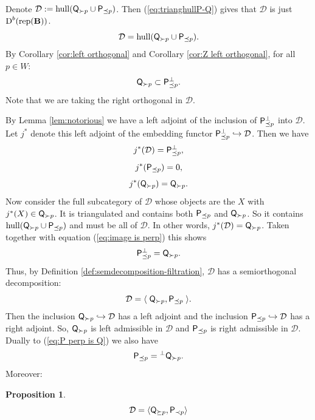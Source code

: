 \documentclass[sn-mathphys-num]{sn-jnl}%
\newcommand{\D}{\mathcal D}
\newcommand{\subsetq}{\subset}
\newcommand{\rep}{{\mathrm{rep}}}
\newcommand{\hull}{{\mathrm{hull}}}
\newcommand*{\Dd}{\mathop{\mathrm D\kern0pt}\nolimits}
\newcommand{\fb}{\mathbf B}
\newtheorem{proposition}[theorem]{Proposition}
\theoremstyle{definition}
\begin{document}
\ 

Denote $\D:=\hull({\sf Q}_{\succ p} \cup {\sf P}_{\preceq p})$. Then (\ref{eq:trianghullP-Q}) gives that $\D$ is just $\Dd ^b(\rep( \fb))$.
\begin{equation}\label{eq:Q>pPleqp-generation}
\D=\hull({\sf Q}_{\succ p} \cup {\sf P}_{\preceq p}).
\end{equation}
By Corollary \ref{cor:left orthogonal} and Corollary \ref{cor:Z left orthogonal}, for all $p\in W$:
\begin{equation}
{\sf Q}_{\succ p}\subsetq{\sf P}_{\preceq p}^{\perp}.
\end{equation}
Note that we are taking the right orthogonal in $\D$.

By Lemma \ref{lem:notorious}  we have a left adjoint of the inclusion of ${\sf P}_{\preceq p}^\perp$ into $\D$.
Let $j^*$ denote this left adjoint of the embedding functor ${\sf P}_{\preceq p}^\perp\hookrightarrow \D$. Then
we have 
\begin{equation}\label{eq:image is perp}
j^*(\D)={\sf P}_{\preceq p}^\perp,
\end{equation}
\begin{equation}
j^*({\sf P}_{\preceq p})=0,
\end{equation}
\begin{equation}
j^*({\sf Q}_{\succ p})= {\sf Q}_{\succ p}.
\end{equation}
Now consider the full subcategory of $\D$ whose objects are the $X$ with $j^*(X)\in {\sf Q}_{\succ p}$.
It is triangulated and contains both ${\sf P}_{\preceq p}$ and  ${\sf Q}_{\succ p}$. So it contains 
$\hull({\sf Q}_{\succ p} \cup {\sf P}_{\preceq p})$ and must be all of $\D$.
In other words, $j^*(\D)= {\sf Q}_{\succ p}$. Taken together with equation (\ref{eq:image is perp}) this shows
\begin{equation}\label{eq:P perp is Q}
{\sf P}_{\preceq p}^\perp= {\sf Q}_{\succ p}.
\end{equation}
Thus, by Definition \ref{def:semdecomposition-filtration}, $\D$ has a semiorthogonal decomposition:
\begin{equation}\label{eq:p-q-SOD-1}
\D=\langle \;{\sf Q}_{\succ p},{\sf P}_{\preceq p}\; \rangle .
\end{equation}
Then the inclusion ${\sf Q}_{\succ p}\hookrightarrow \D$ has a left adjoint and the inclusion ${\sf P}_{\preceq p}\hookrightarrow \D$ has a right adjoint. So, ${\sf Q}_{\succ p}$ is left admissible in $\D$ and ${\sf P}_{\preceq p}$ is right admissible in $\D$. 
Dually to (\ref{eq:P perp is Q}) we also have 
\begin{equation}
{\sf P}_{\preceq p}={}^\perp {\sf Q}_{\succ p}.
\end{equation}
Moreover: 
\begin{proposition}\label{prop:p-q-SOD-2}
\begin{equation}\label{eq:p-q-SOD-2}
\D=\langle {\sf Q}_{\succeq p},{\sf P}_{\prec p}\rangle 
\end{equation}
\end{proposition}
\end{document}

